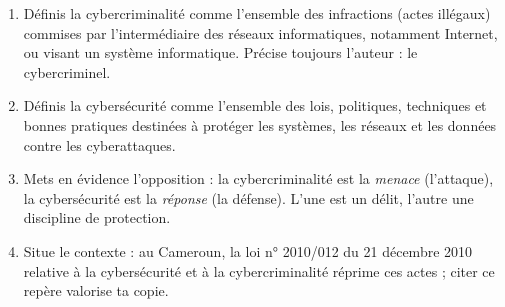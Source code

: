 \documentclass[11pt]{article}
\newcommand{\cle}[1]{{\popxbold\color{popdark}#1}}
\begin{document}
\begin{methode}
\begin{enumerate}
  \item Définis la \cle{cybercriminalité} comme l'ensemble des infractions (actes illégaux) commises par l'intermédiaire des réseaux informatiques, notamment Internet, ou visant un système informatique. Précise toujours l'auteur : le \cle{cybercriminel}.
  \item Définis la \cle{cybersécurité} comme l'ensemble des lois, politiques, techniques et bonnes pratiques destinées à protéger les systèmes, les réseaux et les données contre les cyberattaques.
  \item Mets en évidence l'opposition : la cybercriminalité est la \emph{menace} (l'attaque), la cybersécurité est la \emph{réponse} (la défense). L'une est un délit, l'autre une discipline de protection.
  \item Situe le contexte : au Cameroun, la loi n° 2010/012 du 21 décembre 2010 relative à la cybersécurité et à la cybercriminalité réprime ces actes ; citer ce repère valorise ta copie.
\end{enumerate}
\end{methode}
\end{document}
